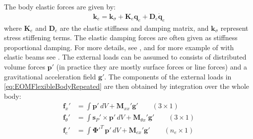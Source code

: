 \documentclass[wes, manuscript]{copernicus}
\renewcommand{\v}[1]{\boldsymbol{#1}}
\newcommand{\m}[1]{\boldsymbol{#1}}
\begin{document}
% 
The body elastic forces are given by:
\begin{align}
  \v{k}_e =  \v{k}_\sigma + \m{K}_e \v{q}_e  + \m{D}_e \v{\dot{q}}_e     %
\end{align}
where $\m{K}_e$ and $\m{D}_e$ are the elastic stiffness and damping matrix, and $\v{k}_\sigma$ represent stress stiffening terms. 
The elastic damping forces are often given as stiffness proportional damping.
For more details, see \cite{Wallrapp:1994}, and for more example of with elastic beams see \cite{branlard:2019flex}.
% 
The external loads can be assumed to consists of distributed volume forces $\v{p}'$ (in practice they are mostly surface forces or line forces) and a gravitational acceleration field $\v{g}'$. The components of the external loads
  in  \autoref{eq:EOMFlexibleBodyRepeated} are then obtained by integration over the whole body:
\begin{align}
    \v{f}_x'&=\int \v{p}' \, dV
        + \m{M}_{xx}'\v{g'}
        \qquad (3\times 1)
            \label{eq:genQgeneral}
    \\
    \v{f}_\theta'&=\int \v{s}_P'\times\v{p}' \, dV
        + \m{M}_{\theta x}'\v{g'}
        \qquad (3\times 1)
    \\
    \v{f}_e'&=\int {\m{\Phi}'}^T\, \v{p}' \, dV
        + \m{M}_{e x}'\v{g'}
        \qquad (n_e\times 1)
\end{align}



\end{document}
